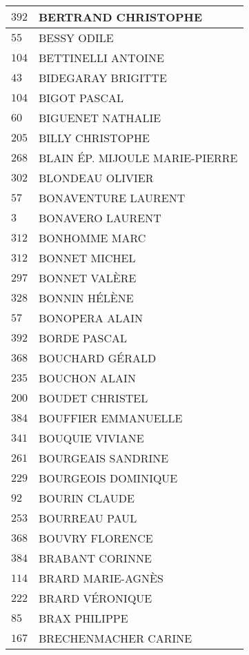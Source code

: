 \begin{xltabular}{\linewidth}{|l|X|}
    \hline
    $392$ & BERTRAND CHRISTOPHE \\
    \hline
    $55$ & BESSY ODILE \\
    \hline
    $104$ & BETTINELLI ANTOINE \\
    \hline
    $43$ & BIDEGARAY BRIGITTE \\
    \hline
    $104$ & BIGOT PASCAL \\
    \hline
    $60$ & BIGUENET NATHALIE \\
    \hline
    $205$ & BILLY CHRISTOPHE \\
    \hline
    $268$ & BLAIN ÉP. MIJOULE MARIE-PIERRE \\
    \hline
    $302$ & BLONDEAU OLIVIER \\
    \hline
    $57$ & BONAVENTURE LAURENT \\
    \hline
    $3$ & BONAVERO LAURENT \\
    \hline
    $312$ & BONHOMME MARC \\
    \hline
    $312$ & BONNET MICHEL \\
    \hline
    $297$ & BONNET VALÈRE \\
    \hline
    $328$ & BONNIN HÉLÈNE \\
    \hline
    $57$ & BONOPERA ALAIN \\
    \hline
    $392$ & BORDE PASCAL \\
    \hline
    $368$ & BOUCHARD GÉRALD \\
    \hline
    $235$ & BOUCHON ALAIN \\
    \hline
    $200$ & BOUDET CHRISTEL \\
    \hline
    $384$ & BOUFFIER EMMANUELLE \\
    \hline
    $341$ & BOUQUIE VIVIANE \\
    \hline
    $261$ & BOURGEAIS SANDRINE \\
    \hline
    $229$ & BOURGEOIS DOMINIQUE \\
    \hline
    $92$ & BOURIN CLAUDE \\
    \hline
    $253$ & BOURREAU PAUL \\
    \hline
    $368$ & BOUVRY FLORENCE \\
    \hline
    $384$ & BRABANT CORINNE \\
    \hline
    $114$ & BRARD MARIE-AGNÈS \\
    \hline
    $222$ & BRARD VÉRONIQUE \\
    \hline
    $85$ & BRAX PHILIPPE \\
    \hline
    $167$ & BRECHENMACHER CARINE \\

\end{xltabular}
